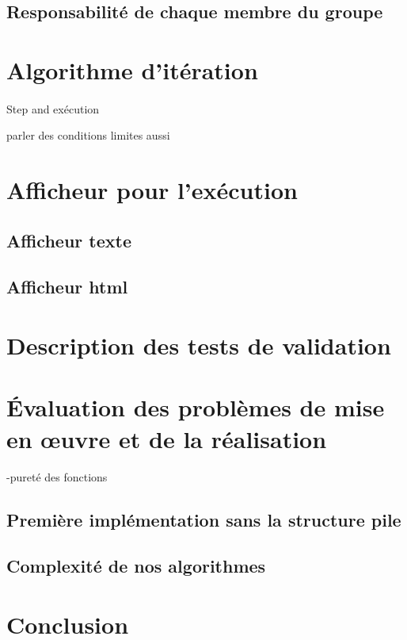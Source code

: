 \documentclass{article}
\begin{document}
\subsection{Responsabilité de chaque membre du groupe}

\section{Algorithme d'itération}
\paragraph{}

Step and exécution

parler des conditions limites aussi

\section{Afficheur pour l'exécution}
\subsection{Afficheur texte}

\subsection{Afficheur html}

\section{Description des tests de validation}

\section{Évaluation des problèmes de mise en œuvre et
de la réalisation}
-pureté des fonctions
\subsection{Première implémentation sans la structure pile}

\subsection{Complexité de nos algorithmes}

\section{Conclusion}
\end{document}
